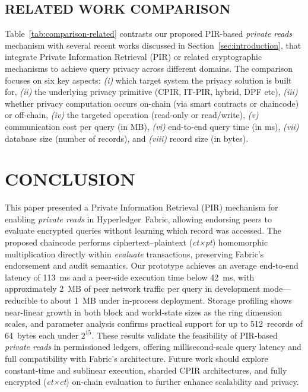 \documentclass[letterpaper,journal]{IEEEtran}
\begin{document}
\subsection{RELATED WORK COMPARISON}
Table~\ref{tab:comparison-related} contrasts our proposed PIR-based \emph{private reads} mechanism with several recent works 
discussed in Section~\ref{sec:introduction},
that integrate Private Information Retrieval (PIR) or related cryptographic mechanisms 
to achieve query privacy across different domains.
The comparison focuses on six key aspects:
\emph{(i)} which target system the privacy solution is built for,
\emph{(ii)} the underlying privacy primitive (CPIR, IT-PIR, hybrid, DPF etc),
\emph{(iii)} whether privacy computation occurs on-chain (via smart contracts or chaincode) or off-chain,
\emph{(iv)} the targeted operation (read-only or read/write),
\emph{(v)} communication cost per query (in MB),
\emph{(vi)} end-to-end query time (in ms),
\emph{(vii)} database size (number of records), and
\emph{(viii)} record size (in bytes).

\section{CONCLUSION}\label{sec:conclusion}
This paper presented a Private Information Retrieval (PIR) mechanism for enabling \emph{private reads} in Hyperledger~Fabric, 
allowing endorsing peers to evaluate encrypted queries without learning which record was accessed. 
The proposed chaincode performs ciphertext–plaintext (\emph{ct×pt}) homomorphic multiplication directly within 
\emph{evaluate} transactions, preserving Fabric’s endorsement and audit semantics. 
Our prototype achieves an average end-to-end latency of 113~ms and a peer-side execution time below 42~ms, 
with approximately 2~MB of peer network traffic per query in development mode—reducible to about 1~MB under in-process deployment. 
Storage profiling shows near-linear growth in both block and world-state sizes as the ring dimension scales, 
and parameter analysis confirms practical support for up to 512~records of 64~bytes each under $2^{15}$.  
These results validate the feasibility of PIR-based \emph{private reads} in permissioned ledgers, 
offering millisecond-scale query latency and full compatibility with Fabric’s architecture. 
Future work should explore constant-time and sublinear execution, sharded CPIR architectures, and fully encrypted 
(\emph{ct×ct}) on-chain evaluation to further enhance scalability and privacy.



\end{document}
